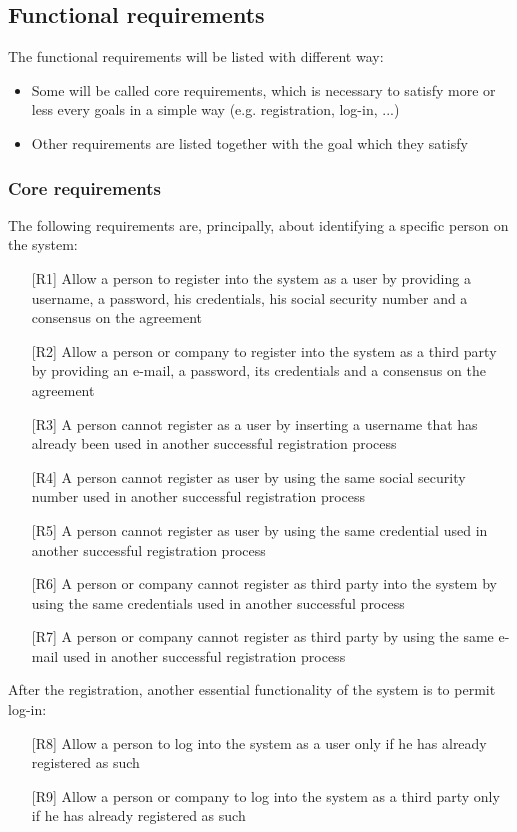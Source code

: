 \subsection{Functional requirements}
\par
The functional requirements will be listed with different way:
\begin{itemize}
\item Some will be called core requirements, which is necessary to satisfy more or less every goals in a simple way (e.g. registration, log-in, ...)
\item Other requirements are listed together with the goal which they satisfy
\end{itemize}

\subsubsection{Core requirements}
\par
The following requirements are, principally, about identifying a specific person on the system:
\begin{itemize}
\item[{[R1]}] Allow a person to register into the system as a user by providing a username, a password, his credentials, his social security number and a consensus on the agreement
\item[{[R2]}] Allow a person or company to register into the system as a third party by providing an e-mail, a password, its credentials and a consensus on the agreement
\item[{[R3]}] A person cannot register as a user by inserting a username that has already been used in another successful registration process
\item[{[R4]}] A person cannot register as user by using the same social security number used in another successful registration process 
\item[{[R5]}] A person cannot register as user by using the same credential used in another successful registration process 
\item[{[R6]}] A person or company cannot register as third party into the system by using the same credentials used in another successful process
\item[{[R7]}] A person or company cannot register as third party by using the same e-mail used in another successful registration process
\end{itemize}
\par
After the registration, another essential functionality of the system is to permit log-in:
\begin{itemize}
\item[{[R8]}] Allow a person to log into the system as a user only if he has already registered as such
\item[{[R9]}] Allow a person or company to log into the system as a third party only if he has already registered as such
\end{itemize}

